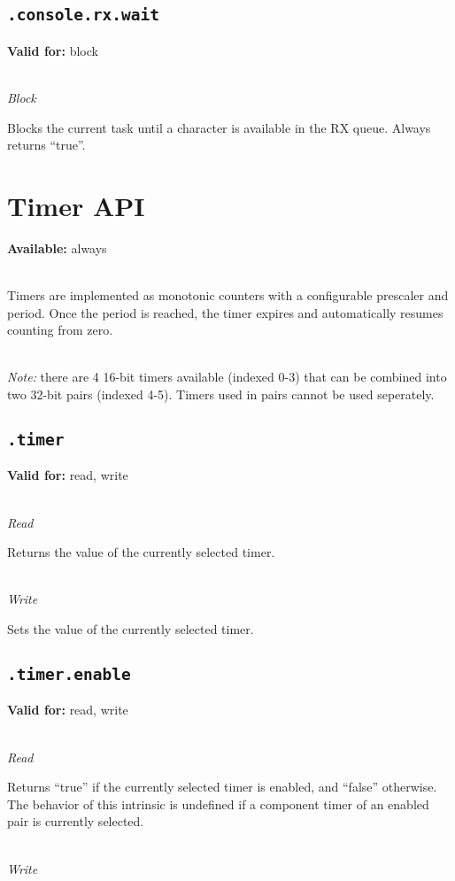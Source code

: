 \documentclass{article}
\begin{document}
\subsection{\texttt{.console.rx.wait}}
\textbf{Valid for:} block

~\\
\textit{Block}

Blocks the current task until a character is available in the RX queue. Always returns ``true''.

\section{Timer API}
\textbf{Available:} always

~\\
Timers are implemented as monotonic counters with a configurable prescaler and period. Once the period is reached, the timer expires and automatically resumes counting from zero.

~\\
\textit{Note:} there are 4 16-bit timers available (indexed 0-3) that can be combined into two 32-bit pairs (indexed 4-5). Timers used in pairs cannot be used seperately.

\subsection{\texttt{.timer}}
\textbf{Valid for:} read, write

~\\
\textit{Read}

Returns the value of the currently selected timer.

~\\
\textit{Write}

Sets the value of the currently selected timer.

\subsection{\texttt{.timer.enable}}
\textbf{Valid for:} read, write

~\\
\textit{Read}

Returns ``true'' if the currently selected timer is enabled, and ``false'' otherwise. The behavior of this intrinsic is undefined if a component timer of an enabled
pair is currently selected.

~\\
\textit{Write}
\end{document}
